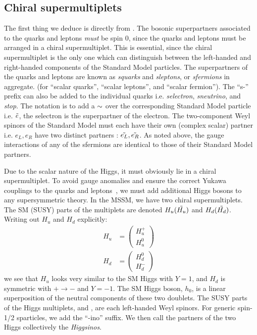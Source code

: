 \subsection{Chiral supermultiplets}

The first thing we deduce is directly from .
The bosonic superpartners associated to the quarks and leptons \textit{must} be spin 0, since the quarks and leptons must be arranged in a chiral supermultiplet.
This is essential, since the chiral supermultiplet is the only one which can distinguish between the left-handed and right-handed components of the Standard Model particles.
The superpartners of the quarks and leptons are known as \textit{squarks} and \textit{sleptons}, or \textit{sfermions} in aggregate. (for ``scalar quarks'', ``scalar leptons'', and ``scalar fermion'').
The ``s-'' prefix can also be added to the individual quarks i.e. \textit{selectron}, \textit{sneutrino}, and \textit{stop}.
The notation is to add a $\sim$ over the corresponding Standard Model particle i.e. $\tilde{e}$, the selectron is the superpartner of the electron.
The two-component Weyl spinors of the Standard Model must each have their own (complex scalar) partner i.e. $e_L, e_R$ have two distinct partners : $\tilde{e_L} ,\tilde{e_R}$.
As noted above, the gauge interactions of any of the sfermions are identical to those of their Standard Model partners.

Due to the scalar nature of the Higgs, it must obviously lie in a chiral supermultiplet.
To avoid gauge anomalies and ensure the correct Yukawa couplings to the quarks and leptons~\cite{susyPrimer}, we must add additional Higgs bosons to any supersymmetric theory.
In the MSSM, we have two chiral supermultiplets.
The SM (SUSY) parts of the multiplets are denoted $H_u (\tilde{H_u})$ and $H_d (\tilde{H_d})$.
Writing out $H_u$ and $H_d$ explicitly:
\begin{align}
H_u &= \begin{pmatrix} H_u^+ \\ H_u^0 \end{pmatrix}\\
H_d &= \begin{pmatrix} H_d^0 \\ H_d^- \end{pmatrix}
\end{align}
we see that $H_u$ looks very similar to the SM Higgs with $Y = 1$, and $H_d$ is symmetric with $+ \rightarrow -$ and $ Y = -1$.
The SM Higgs boson, $h_0$, is a linear superposition of the neutral components of these two doublets.
The SUSY parts of the Higgs multiplets,  and , are each left-handed Weyl spinors.
For generic spin-1/2 sparticles, we add the ``-ino'' suffix.
We then call the partners of the two Higgs collectively the \textit{Higgsinos}.

